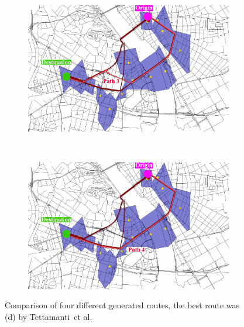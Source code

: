 \begin{figure}
	\begin{subfigure}[b]{0.5\linewidth}
			\includegraphics[width=\textwidth]{./images/tattipath2}
			\caption{}
			\label{fig:tattipath2}
		\end{subfigure}%
		~
		\begin{subfigure}[b]{0.5\linewidth}
			\includegraphics[width=\textwidth]{./images/tattipath3}
			\caption{}
			\label{fig:tattipath3}
		\end{subfigure}

	\caption{Comparison of four different generated routes, the best route was (d) by Tettamanti~et al.\ \cite{Tettamanti2012}}\label{fig:tettaroutes}
\end{figure}


